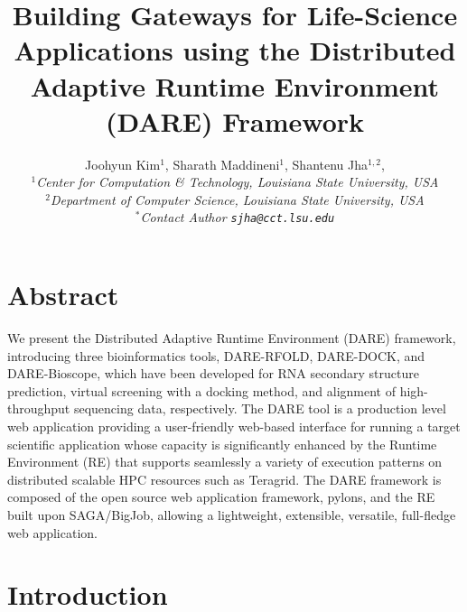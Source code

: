 \documentclass[12pt]{article}
\begin{document}

\title{Building Gateways for Life-Science Applications using the
  Distributed Adaptive Runtime Environment (DARE) Framework}

\author{Joohyun Kim$^{1}$, Sharath Maddineni$^{1}$, Shantenu Jha$^{1,2}$, \\
  \small{\emph{$^{1}$Center for Computation \& Technology, Louisiana State University, USA}}\\
  \small{\emph{$^{2}$Department of Computer Science, Louisiana State University, USA}}\\
  \small{\emph{$^{*}$Contact Author \texttt{sjha@cct.lsu.edu}}} }

\maketitle

\section*{Abstract}
We present the Distributed Adaptive Runtime Environment (DARE)
framework, introducing three bioinformatics tools, DARE-RFOLD,
DARE-DOCK, and DARE-Bioscope, which have been developed for RNA
secondary structure prediction, virtual screening with a docking
method, and alignment of high-throughput sequencing data,
respectively.  The DARE tool is a production level web application
providing a user-friendly web-based interface for running a target
scientific application whose capacity is significantly enhanced by the
Runtime Environment (RE) that supports seamlessly a variety of
execution patterns on distributed scalable HPC resources such as
Teragrid.  The DARE framework is composed of the open source web
application framework, pylons, and the RE built upon SAGA/BigJob,
allowing a lightweight, extensible, versatile, full-fledge web
application.


\section{Introduction}

% 
% 
\end{document}
